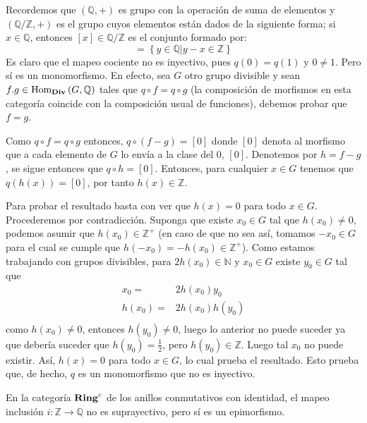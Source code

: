 \documentclass[12pt]{report}
\theoremstyle{largebreak}
\newcommand\cf[3]{\ensuremath{#1:#2\rightarrow#3}}
\newcommand{\Hom}[3]{\ensuremath{\textup{Hom}_{#1}\left(#2,#3\right)}}
\newcommand{\Cat}[1]{\ensuremath{\textup{\textbf{#1}}}}
\begin{document}
    \begin{sol}
        Recordemos que $(\mathbb{Q},+)$ es grupo con la operación de suma de elementos y $(\mathbb{Q}/\mathbb{Z},+)$ es el grupo cuyos elementos están dados de la siguiente forma; si $x\in\mathbb{Q}$, entonces $[x]\in\mathbb{Q}/\mathbb{Z}$ es el conjunto formado por:
        \begin{equation*}
            [x]=\left\{y\in\mathbb{Q}\big|y-x\in\mathbb{Z}  \right\}
        \end{equation*}
        Es claro que el mapeo cociente no es inyectivo, pues $q(0)=q(1)$ y $0\neq 1$. Pero sí es un monomorfismo. En efecto, sea $G$ otro grupo divisible y sean $f.g\in\Hom{\Cat{Div}}{G}{\mathbb{Q}}$ tales que $q\circ f = q\circ g$ (la composición de morfismos en esta categoría coincide con la composición usual de funciones), debemos probar que $f=g$.

        Como $q\circ f = q\circ g$ entonces, $q\circ(f-g)=[0]$ donde $[0]$ denota al morfismo que a cada elemento de $G$ lo envía a la clase del $0$, $[0]$. Denotemos por $h=f-g$, se sigue entonces que $q\circ h=[0]$. Entonces, para cualquier $x\in G$ tenemos que $q(h(x))=[0]$, por tanto $h(x)\in\mathbb{Z}$.
        
        Para probar el resultado basta con ver que $h(x)=0$ para todo $x\in G$. Procederemos por contradicción. Suponga que existe $x_0\in G$ tal que $h(x_0)\neq 0$, podemos asumir que $h(x_0)\in\mathbb{Z}^+$ (en caso de que no sea así, tomamos $-x_0\in G$ para el cual se cumple que $h(-x_0)=-h(x_0)\in\mathbb{Z}^+$). Como estamos trabajando con grupos divisibles, para $2h(x_0) \in\mathbb{N}$ y $x_0\in G$ existe $y_0\in G$ tal que
        \begin{equation*}
            \begin{split}
                x_0=&2h(x_0)y_0\\
                h(x_0)=&2h(x_0)h(y_0)\\
            \end{split}
        \end{equation*}
        como $h(x_0)\neq 0$, entonces $h(y_0)\neq 0$, luego lo anterior no puede suceder ya que debería suceder que $h(y_0)=\frac{1}{2}$, pero $h(y_0)\in\mathbb{Z}$. Luego tal $x_0$ no puede existir. Así, $h(x)=0$ para todo $x\in G$, lo cual prueba el resultado. Esto prueba que, de hecho, $q$ es un monomorfismo que no es inyectivo.
    \end{sol}

    \begin{exa}
        En la categoría $\Cat{Ring}^c$ de los anillos conmutativos con identidad, el mapeo inclusión $\cf{i}{\mathbb{Z}}{\mathbb{Q}}$ no es suprayectivo, pero sí es un epimorfismo.
    \end{exa}

    \begin{sol}
        
    \end{sol}
    
\end{document}
